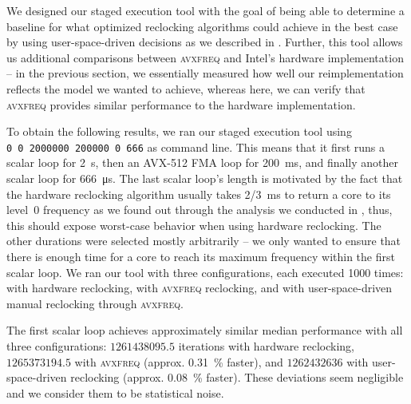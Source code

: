 We designed our staged execution tool with the goal of being able to determine a baseline for what optimized reclocking algorithms could achieve in the best case by using user-space-driven decisions as we described in . Further, this tool allows us additional comparisons between \textsc{avxfreq} and Intel's hardware implementation -- in the previous section, we essentially measured how well our reimplementation reflects the model we wanted to achieve, whereas here, we can verify that \textsc{avxfreq} provides similar performance to the hardware implementation.

To obtain the following results, we ran our staged execution tool using\\\texttt{0~0~2000000~200000~0~666} as command line. This means that it first runs a scalar loop for \SI{2}{\second}, then an \gls{AVX-512} \gls{FMA} loop for \SI{200}{\milli\second}, and finally another scalar loop for \SI{666}{\micro\second}. The last scalar loop's length is motivated by the fact that the hardware reclocking algorithm usually takes \SI[quotient-mode=fraction]{2/3}{\milli\second} to return a core to its level~0 frequency as we found out through the analysis we conducted in , thus, this should expose worst-case behavior when using hardware reclocking. The other durations were selected mostly arbitrarily -- we only wanted to ensure that there is enough time for a core to reach its maximum frequency within the first scalar loop. We ran our tool with three configurations, each executed 1000 times: with hardware reclocking, with \textsc{avxfreq} reclocking, and with user-space-driven manual reclocking through \textsc{avxfreq}.

The first scalar loop achieves approximately similar median performance with all three configurations: $1261438095.5$ iterations with hardware reclocking, $1265373194.5$ with \textsc{avxfreq} (approx. \SI{0.31}{\percent} faster), and $1262432636$ with user-space-driven reclocking (approx. \SI{0.08}{\percent} faster). These deviations seem negligible and we consider them to be statistical noise.

